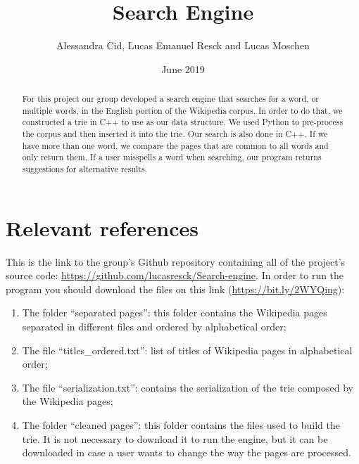 \documentclass{article}
\title{Search Engine}
\author{Alessandra Cid, Lucas Emanuel Resck  
and Lucas Moschen}
\date{June 2019}
\begin{document}
\maketitle

\begin{abstract}
For this project our group developed a search engine that searches for a word, or multiple words, in the English portion of the Wikipedia corpus. In order to do that, we constructed a trie in C++ to use as our data structure. We used Python to pre-process the corpus and then inserted it into the trie. Our search is also done in C++. If we have more than one word, we compare the pages that are common to all words and only return them. If a user misspells a word when searching, our program returns suggestions for alternative results. 
\end{abstract}

\section*{Relevant references}
This is the link to the group's Github repository containing all of the project's source code: \url{https://github.com/lucasresck/Search-engine}.
In order to run the program you should download the files on this link (\url{https://bit.ly/2WYQing}): 

\begin{enumerate}
\item The folder ``separated pages'': this folder contains the Wikipedia pages separated in different files and ordered by alphabetical order;

\item The file ``titles\_ordered.txt'': list of titles of Wikipedia pages in alphabetical order;

\item The file ``serialization.txt'': contains the serialization of the trie composed by the Wikipedia pages;

\item The folder ``cleaned pages'': this folder contains the files used to build the trie. It is not necessary to download it to run the engine, but it can be downloaded in case a user wants to change the way the pages are processed. 
 \end{enumerate}
\end{document}
